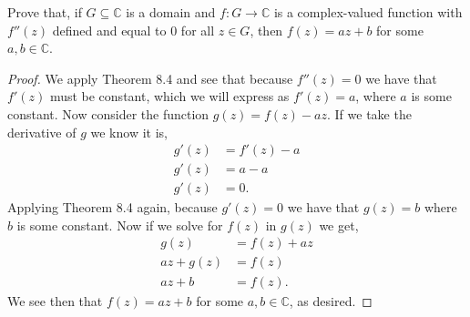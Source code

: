 \documentclass[11pt]{article}
\newenvironment{problem}[2][Problem\!]{\begin{trivlist}
\item[\hskip \labelsep {\bfseries #1}\hskip \labelsep {\bfseries #2}]}{\end{trivlist}}
\newcommand{\cc}{\mathbb C}   %
\begin{document}
\begin{problem}{4.4}
Prove that, if $G \subseteq \cc$ is a domain and $f : G \to \cc$ is a complex-valued function with $f''(z)$ defined and equal to $0$ for all $z \in G$, then $f(z) = az + b$ for some $a, b \in \cc$. 
\end{problem}
\begin{proof}
  We apply Theorem 8.4 and see that because $f''(z) = 0$ we have that $f'(z) $ must be constant, which we will express as $f'(z) = a$, where $a$ is some constant. Now consider the function $g(z) = f(z) - az$. If we take the derivative of $g$ we know it is,
  \begin{align*}
    g'(z) &= f'(z) -a  \\
    g'(z) &= a-a \\
    g'(z)&= 0.
  \end{align*}
  Applying Theorem 8.4 again, because $g'(z) =0$ we have that $g(z) = b$ where $b$ is some constant. Now if we solve for $f(z)$ in $g(z)$ we get,
  \begin{align*}
    g(z) &= f(z) + az \\
    az + g(z) &= f(z) \\
    az + b &= f(z).
  \end{align*}
  We see then that $f(z) = az+b $ for some $a,b\in \cc$, as desired. 
\end{proof}

\newpage  %
\end{document}
